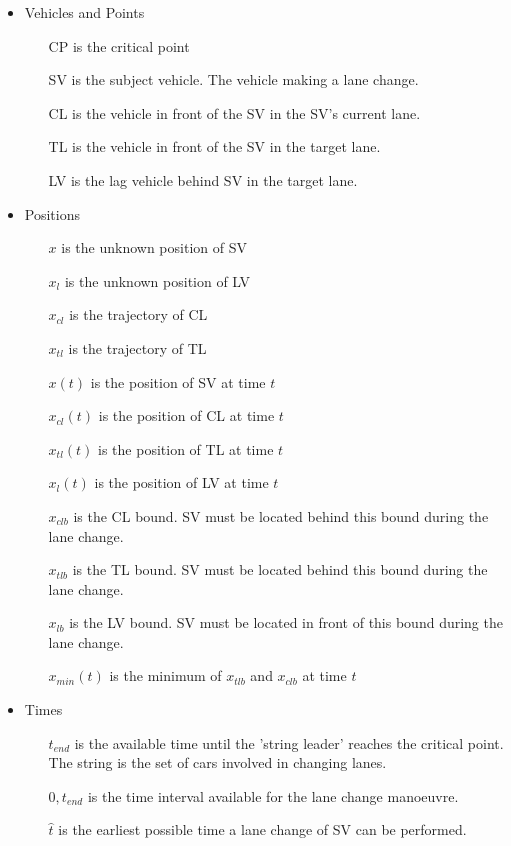 \begin{itemize}
\item Vehicles and Points
\begin{itemize}
\item[CP] is the critical point
\item[SV] is the subject vehicle. The vehicle making a lane change.
\item[CL] is the vehicle in front of the SV in the SV's current lane.
\item[TL] is the vehicle in front of the SV in the target lane.
\item[LV] is the lag vehicle behind SV in the target lane.
\end{itemize}
\item Positions
\begin{itemize}
\item[$x$] is the unknown position of SV
\item[$x_l$] is the unknown position of LV
\item[$x_{cl}$] is the trajectory of CL
\item[$x_{tl}$] is the trajectory of TL
\item[$x(t)$] is the position of SV at time $t$
\item[$x_{cl}(t)$] is the position of CL at time $t$
\item[$x_{tl}(t)$] is the position of TL at time $t$
\item[$x_l(t)$] is the position of LV at time $t$
\item[$x_{clb}$] is the CL bound. SV must be located behind this bound during the lane change.
\item[$x_{tlb}$] is the TL bound. SV must be located behind this bound during the lane change.
\item[$x_{lb}$] is the LV bound. SV must be located in front of this bound during the lane change.
\item[$x_{min}(t)$] is the minimum of $x_{tlb}$ and $x_{clb}$ at time $t$
\end{itemize}
\item Times
\begin{itemize}
\item[$t_{end}$] is the available time until the 'string leader' reaches the critical point. The string is the set of cars involved in changing lanes.
\item[$0,t_{end}$] is the time interval available for the lane change manoeuvre.
\item[$\hat{t}$] is the earliest possible time a lane change of SV can be performed.

\end{itemize}
\end{itemize}
